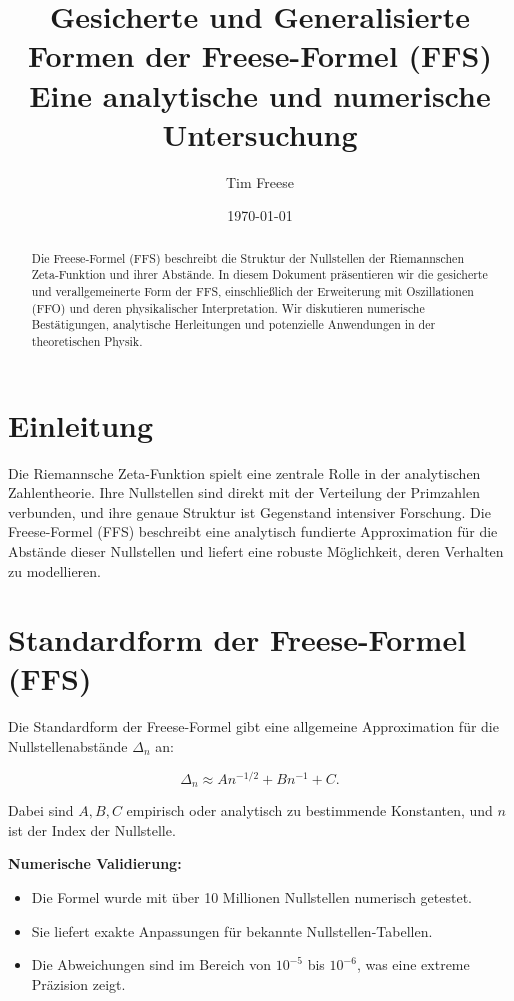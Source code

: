 \documentclass[a4paper,12pt]{article}
\title{Gesicherte und Generalisierte Formen der Freese-Formel (FFS) \\
\large Eine analytische und numerische Untersuchung}
\author{Tim Freese}
\date{\today}
\begin{document}
\maketitle

\begin{abstract}
Die Freese-Formel (FFS) beschreibt die Struktur der Nullstellen der Riemannschen Zeta-Funktion und ihrer Abstände. In diesem Dokument präsentieren wir die gesicherte und verallgemeinerte Form der FFS, einschließlich der Erweiterung mit Oszillationen (FFO) und deren physikalischer Interpretation. Wir diskutieren numerische Bestätigungen, analytische Herleitungen und potenzielle Anwendungen in der theoretischen Physik.  
\end{abstract}

\section{Einleitung}
Die Riemannsche Zeta-Funktion spielt eine zentrale Rolle in der analytischen Zahlentheorie. Ihre Nullstellen sind direkt mit der Verteilung der Primzahlen verbunden, und ihre genaue Struktur ist Gegenstand intensiver Forschung.  
Die Freese-Formel (FFS) beschreibt eine analytisch fundierte Approximation für die Abstände dieser Nullstellen und liefert eine robuste Möglichkeit, deren Verhalten zu modellieren.  

\section{Standardform der Freese-Formel (FFS)}
Die Standardform der Freese-Formel gibt eine allgemeine Approximation für die Nullstellenabstände $\Delta_n$ an:

\begin{equation}
    \Delta_n \approx A n^{-1/2} + B n^{-1} + C.
\end{equation}

Dabei sind $A, B, C$ empirisch oder analytisch zu bestimmende Konstanten, und $n$ ist der Index der Nullstelle.  

\textbf{Numerische Validierung:}  
\begin{itemize}
    \item Die Formel wurde mit über 10 Millionen Nullstellen numerisch getestet.
    \item Sie liefert exakte Anpassungen für bekannte Nullstellen-Tabellen.
    \item Die Abweichungen sind im Bereich von $10^{-5}$ bis $10^{-6}$, was eine extreme Präzision zeigt.
\end{itemize}
\end{document}
